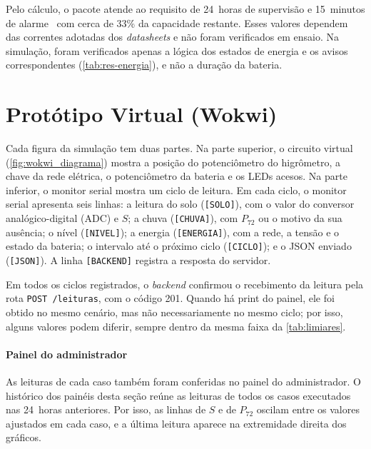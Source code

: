 Pelo cálculo, o pacote atende ao requisito de 24~horas de
supervisão e 15~minutos de alarme~\cite[item~5.3]{cbmmg2017it14} com
cerca de 33\% da capacidade restante. Esses valores dependem das
correntes adotadas dos \textit{datasheets} e não foram verificados em
ensaio.
Na simulação, foram verificados apenas a lógica dos estados de energia
e os avisos correspondentes (\autoref{tab:res-energia}), e não a
duração da bateria.

\section{Protótipo Virtual (Wokwi)}
\label{sec:res-simulacao}

Cada figura da simulação tem duas partes. Na parte superior, o circuito
virtual (\autoref{fig:wokwi_diagrama}) mostra a posição do
potenciômetro do higrômetro, a chave da rede elétrica, o potenciômetro
da bateria e os LEDs acesos. Na parte inferior, o monitor serial mostra
um ciclo de leitura.
Em cada ciclo, o monitor serial apresenta seis linhas: a leitura do solo
(\texttt{[SOLO]}), com o valor do conversor analógico-digital (ADC) e
$S$; a chuva (\texttt{[CHUVA]}), com $P_{72}$ ou o motivo da sua
ausência; o nível (\texttt{[NIVEL]}); a energia (\texttt{[ENERGIA]}),
com a rede, a tensão e o estado da bateria; o intervalo até o próximo
ciclo (\texttt{[CICLO]}); e o JSON enviado (\texttt{[JSON]}). A linha
\texttt{[BACKEND]} registra a resposta do servidor.

Em todos os ciclos registrados, o \textit{backend} confirmou o
recebimento da leitura pela rota \texttt{POST /leituras}, com o código
201. Quando há print do painel, ele foi obtido no mesmo cenário, mas
não necessariamente no mesmo ciclo; por isso, alguns valores podem
diferir, sempre dentro da mesma faixa da \autoref{tab:limiares}.

\paragraph*{Painel do administrador}

As leituras de cada caso também foram conferidas no painel do
administrador.
O histórico dos painéis desta seção reúne as leituras de todos os casos
executados nas 24~horas anteriores. Por isso, as linhas de $S$ e de
$P_{72}$ oscilam entre os valores ajustados em cada caso, e a última
leitura aparece na extremidade direita dos gráficos.

